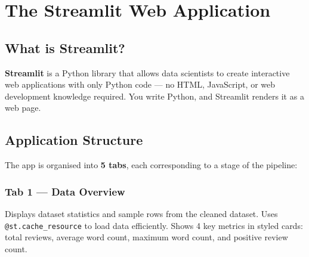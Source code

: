 \documentclass[12pt, a4paper]{article}
\begin{document}
\newpage

\section{The Streamlit Web Application}

\subsection{What is Streamlit?}

\textbf{Streamlit} is a Python library that allows data scientists to create interactive web applications with only Python code — no HTML, JavaScript, or web development knowledge required. You write Python, and Streamlit renders it as a web page.

\subsection{Application Structure}

The app is organised into \textbf{5 tabs}, each corresponding to a stage of the pipeline:

\begin{center}
\end{center}

\subsubsection{Tab 1 — Data Overview}

Displays dataset statistics and sample rows from the cleaned dataset. Uses \texttt{@st.cache\_resource} to load data efficiently. Shows 4 key metrics in styled cards: total reviews, average word count, maximum word count, and positive review count.
\end{document}
